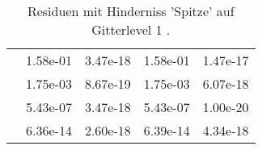 \begin{table}
\begin{tabular}{c|cc|cc|}
\multicolumn{1}{|c|}{} & \multicolumn{1}{|c|}{  1.58e-01} & \multicolumn{1}{|c|}{  3.47e-18} & \multicolumn{1}{|c|}{  1.58e-01} & \multicolumn{1}{|c|}{  1.47e-17} \\ 
\multicolumn{1}{|c|}{} & \multicolumn{1}{|c|}{  1.75e-03} & \multicolumn{1}{|c|}{  8.67e-19} & \multicolumn{1}{|c|}{  1.75e-03} & \multicolumn{1}{|c|}{  6.07e-18} \\ 
\multicolumn{1}{|c|}{} & \multicolumn{1}{|c|}{  5.43e-07} & \multicolumn{1}{|c|}{  3.47e-18} & \multicolumn{1}{|c|}{  5.43e-07} & \multicolumn{1}{|c|}{  1.00e-20} \\ 
\multicolumn{1}{|c|}{} & \multicolumn{1}{|c|}{  6.36e-14} & \multicolumn{1}{|c|}{  2.60e-18} & \multicolumn{1}{|c|}{  6.39e-14} & \multicolumn{1}{|c|}{  4.34e-18} \\ 
\hline 
\end{tabular}\caption{Residuen mit Hinderniss 'Spitze' auf Gitterlevel 1 .}\label{tab:Residuum_Spitze_level1}
\end{table} 
